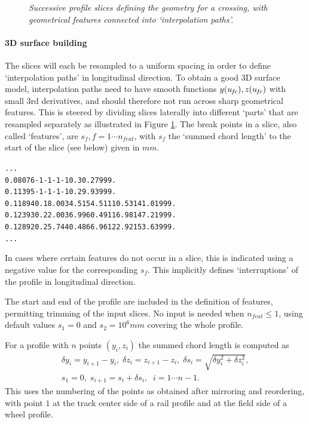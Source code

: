 \documentclass[12pt]{report}
\begin{document}
\begin{figure}[bt]
\centering
{}
\caption{\em Successive profile slices defining the geometry for a crossing,
        with geometrical features connected into `interpolation paths'.}
\label{fig:slcs_features}
\end{figure}

\paragraph{3D surface building}

The slices will each be resampled to a uniform spacing in order to define
`interpolation paths' in longitudinal direction. To obtain a good 3D
surface model, interpolation paths need to have smooth functions $y(u_{\mkern-2muf\mkern-2muc}),
z(u_{\mkern-2muf\mkern-2muc})$ with small 3rd derivatives, and should therefore not run across
sharp geometrical features. This is steered by dividing slices laterally
into different `parts' that are resampled separately as illustrated in
Figure \ref{fig:slcs_features}. The break points in a slice, also called
`features', are $s_f, f=1\cdots n_{feat}$, with $s_f$ the `summed chord
length' to the start of the slice (see below) given in $\unit{mm}$.

\begin{alltt}\small
          ...
 0.08076     -1      -1       -1       -1       0.      30.27   999.
 0.11395     -1      -1       -1       -1       0.      29.93   999.
 0.11894      0.    18.00    34.51    54.51   110.53   141.01   999.
 0.12393      0.    22.00    36.99    60.49   116.98   147.21   999.
 0.12892      0.    25.74    40.48    66.96   122.92   153.63   999.
          ...
\end{alltt}
In cases where certain features do not occur in a slice, this is indicated
using a negative value for the corresponding $s_f$. This implicitly defines
`interruptions' of the profile in longitudinal direction.

The start and end of the profile are included in the definition of features,
permitting trimming of the input slices. No input is needed when
$n_{feat}\le 1$, using default values $s_1=0$ and $s_2=10^6\unit{mm}$
covering the whole profile. 

For a profile with $n$ points $(y_i,z_i)$ the summed chord length is computed
as
\begin{eqnarray}
    \delta y_i = y_{i+1}-y_i, \;
    \delta z_i = z_{i+1}-z_i, \;
    \delta s_i = \sqrt{ \delta y_i^2 + \delta z_i^2 }, \nonumber \\
    s_1 = 0, \; s_{i+1} = s_i + \delta s_i , \;\;
                i = 1 \cdots n-1. \label{eq:summed_chord}
\end{eqnarray}
This uses the numbering of the points as obtained after mirroring and
reordering, with point $1$ at the track center side of a rail profile
and at the field side of a wheel profile.
\end{document}
